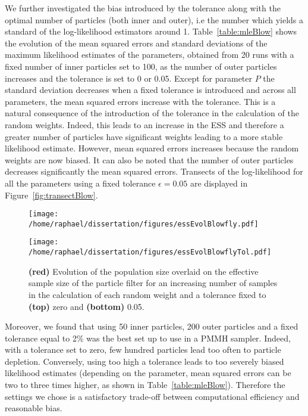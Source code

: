 \documentclass[12pt]{article}
\begin{document}
	We further investigated the bias introduced by the tolerance along with the optimal number of particles (both inner and outer), i.e the number which yields a standard of the log-likelihood estimators around 1. Table~\ref{table:mleBlow} shows the evolution of the mean squared errors and standard deviations of the maximum likelihood estimates of the parameters, obtained from 20 runs with a fixed number of inner particles set to 100, as the number of outer particles increases and the tolerance is set to 0 or 0.05. Except for parameter $P$ the standard deviation decreases when a fixed tolerance is introduced and across all parameters, the mean squared errors increase with the tolerance. This is a natural consequence of the introduction of the tolerance in the calculation of the random weights. Indeed, this leads to an increase in the ESS and therefore a greater number of particles have significant weights leading to a more stable likelihood estimate. However, mean squared errors increases because the random weights are now biased. It can also be noted that the number of outer particles decreases significantly the mean squared errors.
	Transects of the log-likelihood for all the parameters using a fixed tolerance $\epsilon=0.05$ are displayed in Figure~\ref{fig:transectBlow}. 

	\begin{figure}[htb]
		\centering
		\begin{minipage}{0.6\textwidth}
			\centering
			\texttt{[image: /home/raphael/dissertation/figures/essEvolBlowfly.pdf]}
		\end{minipage}
		\begin{minipage}{0.6\textwidth}
			\centering
			\texttt{[image: /home/raphael/dissertation/figures/essEvolBlowflyTol.pdf]}
		\end{minipage}
		\caption[Evolution of the ESS, Nicholson's blowfly model with the number of inner particles and the tolerance level]{\textbf{(red)} Evolution of the population size overlaid on the effective sample size of the particle filter for an increasing number of samples in the calculation of each random weight and a tolerance fixed to \textbf{(top)} zero and \textbf{(bottom)} 0.05.}
		\label{fig:essBlow}
	\end{figure}

	
	Moreover, we found that using 50 inner particles, 200 outer particles and a fixed tolerance equal to 2\% was the best set up to use in a PMMH sampler. Indeed, with a tolerance set to zero, few hundred particles lead too often to particle depletion. Conversely, using too high a tolerance leads to too severely biased likelihood estimates (depending on the parameter, mean squared errors can be two to three times higher, as shown in Table~\ref{table:mleBlow}). Therefore the settings we chose is a satisfactory trade-off between computational efficiency and reasonable bias.
	
\end{document}
